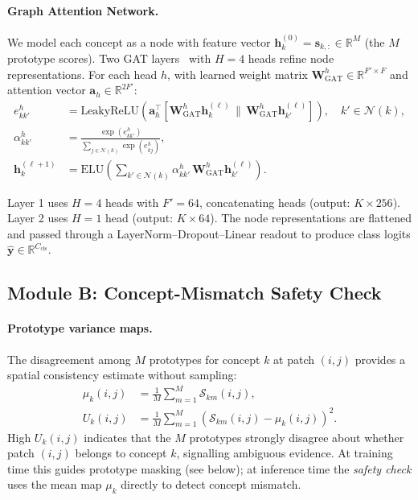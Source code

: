 \documentclass{article}
\begin{document}
\paragraph{Graph Attention Network.}
We model each concept as a node with feature vector $\mathbf{h}_k^{(0)} = \mathbf{s}_{k,:} \in \mathbb{R}^M$ (the $M$ prototype scores).
Two GAT layers~\cite{velickovic2018graph} with $H=4$ heads refine node representations.
For each head $h$, with learned weight matrix $\mathbf{W}_{\text{GAT}}^h \in \mathbb{R}^{F' \times F}$ and attention vector $\mathbf{a}_h \in \mathbb{R}^{2F'}$:
\begin{align}
    e_{kk'}^h &= \text{LeakyReLU}\!\left(\mathbf{a}_h^\top \left[\mathbf{W}_{\text{GAT}}^h\mathbf{h}_k^{(\ell)} \,\|\, \mathbf{W}_{\text{GAT}}^h\mathbf{h}_{k'}^{(\ell)}\right]\right), \quad k' \in \mathcal{N}(k), \\
    \alpha_{kk'}^h &= \frac{\exp(e_{kk'}^h)}{\sum_{j \in \mathcal{N}(k)} \exp(e_{kj}^h)}, \\
    \mathbf{h}_k^{(\ell+1)} &= \text{ELU}\!\left(\sum_{k' \in \mathcal{N}(k)} \alpha_{kk'}^h\, \mathbf{W}_{\text{GAT}}^h\mathbf{h}_{k'}^{(\ell)}\right).
\end{align}

Layer 1 uses $H=4$ heads with $F'=64$, concatenating heads (output: $K \times 256$). Layer 2 uses $H=1$ head (output: $K \times 64$). The node representations are flattened and passed through a LayerNorm–Dropout–Linear readout to produce class logits $\hat{\mathbf{y}} \in \mathbb{R}^{C_{\text{cls}}}$.

\subsection{Module B: Concept-Mismatch Safety Check}
\label{sec:uncertainty}

\paragraph{Prototype variance maps.}
The disagreement among $M$ prototypes for concept $k$ at patch $(i,j)$ provides a spatial consistency estimate without sampling:
\begin{align}
    \mu_k(i,j) &= \frac{1}{M} \sum_{m=1}^M \mathcal{S}_{km}(i,j), \\
    U_k(i,j) &= \frac{1}{M} \sum_{m=1}^M \!\left(\mathcal{S}_{km}(i,j) - \mu_k(i,j)\right)^2.
    \label{eq:uncertainty}
\end{align}
High $U_k(i,j)$ indicates that the $M$ prototypes strongly disagree about whether patch $(i,j)$ belongs to concept $k$, signalling ambiguous evidence. At training time this guides prototype masking (see below); at inference time the \emph{safety check} uses the mean map $\mu_k$ directly to detect concept mismatch.
\end{document}

